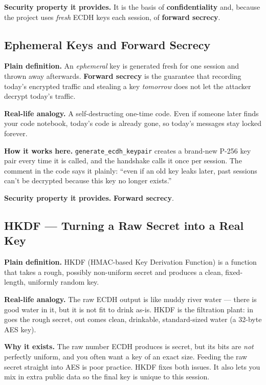 \documentclass[11pt,a4paper]{article}
\begin{document}
\textbf{Security property it provides.} It is the basis of
\textbf{confidentiality} and, because the project uses \emph{fresh} ECDH keys
each session, of \textbf{forward secrecy}.

\subsection{Ephemeral Keys and Forward Secrecy}
\textbf{Plain definition.} An \emph{ephemeral} key is generated fresh for one
session and thrown away afterwards. \textbf{Forward secrecy} is the guarantee
that recording today's encrypted traffic and stealing a key \emph{tomorrow} does
not let the attacker decrypt today's traffic.

\textbf{Real-life analogy.} A self-destructing one-time code. Even if someone
later finds your code notebook, today's code is already gone, so today's messages
stay locked forever.

\textbf{How it works here.} \texttt{generate\_ecdh\_keypair} creates a brand-new
P-256 key pair every time it is called, and the handshake calls it once per
session. The comment in the code says it plainly: ``even if an old key leaks
later, past sessions can't be decrypted because this key no longer exists.''

\textbf{Security property it provides.} \textbf{Forward secrecy}.

\subsection{HKDF --- Turning a Raw Secret into a Real Key}
\textbf{Plain definition.} HKDF (HMAC-based Key Derivation Function) is a
function that takes a rough, possibly non-uniform secret and produces a clean,
fixed-length, uniformly random key.

\textbf{Real-life analogy.} The raw ECDH output is like muddy river water ---
there is good water in it, but it is not fit to drink as-is. HKDF is the
filtration plant: in goes the rough secret, out comes clean, drinkable,
standard-sized water (a 32-byte AES key).

\textbf{Why it exists.} The raw number ECDH produces is secret, but its bits are
\emph{not} perfectly uniform, and you often want a key of an exact size. Feeding
the raw secret straight into AES is poor practice. HKDF fixes both issues. It
also lets you mix in extra public data so the final key is unique to this
session.
\end{document}
